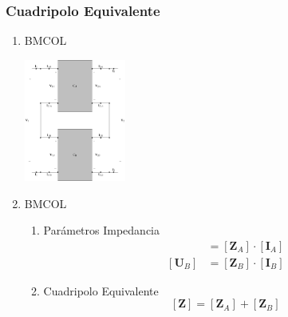 \subsubsection{Cuadripolo Equivalente}
\label{sec:orga827299}
\begin{enumerate}
\item \hfill{}\textsc{BMCOL}
\label{sec:org213121f}

\includegraphics[height=4cm]{../figs/serie-serie.pdf}



\item \hfill{}\textsc{BMCOL}
\label{sec:org38dbe81}
\begin{enumerate}
\item Parámetros Impedancia
\label{sec:orgb198b8f}
\begin{align*}
  [\mathbf{U}_A] &= [\mathbf{Z}_A] \cdot [\mathbf{I}_A]\\
  [\mathbf{U}_B] &= [\mathbf{Z}_B] \cdot [\mathbf{I}_B]
\end{align*}

\item Cuadripolo Equivalente
\label{sec:org2696460}
\[
  \boxed{[\mathbf{Z}] = [\mathbf{Z}_A] + [\mathbf{Z}_B]}
\]
\end{enumerate}
\end{enumerate}

